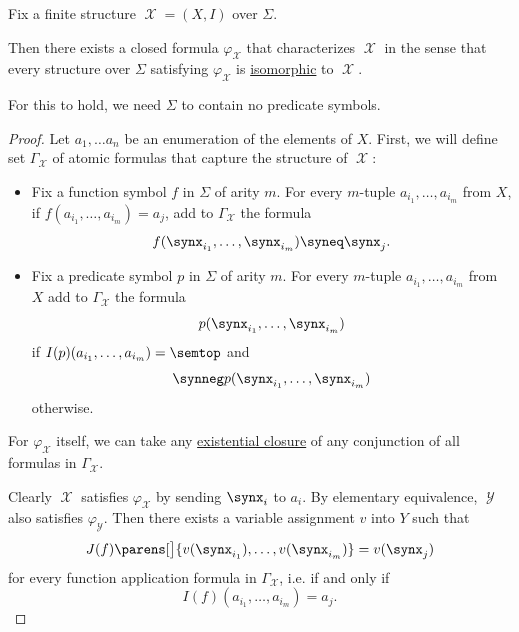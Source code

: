 \begin{lemma}\label{thm:fol_finite_structure_characterizing_formula}
  Fix a finite structure \( \mscrX = (X, I) \) over \( \Sigma \).

  Then there exists a closed formula \( \varphi_\mscrX \) that characterizes \( \mscrX \) in the sense that every structure over \( \Sigma \) satisfying \( \varphi_\mscrX \) is \hyperref[def:fol_isomorphism]{isomorphic} to \( \mscrX \).

  For this to hold, we need \( \Sigma \) to contain no predicate symbols.
\end{lemma}
\begin{proof}
  Let \( a_1, \ldots a_n \) be an enumeration of the elements of \( X \). First, we will define set \( \Gamma_\mscrX \) of atomic formulas that capture the structure of \( \mscrX \):
  \begin{itemize}
    \item Fix a function symbol \( f \) in \( \Sigma \) of arity \( m \). For every \( m \)-tuple \( a_{i_1}, \ldots, a_{i_m} \) from \( X \), if \( f(a_{i_1}, \ldots, a_{i_m}) = a_j \), add to \( \Gamma_\mscrX \) the formula
    \begin{equation*}
      f(\synx_{i_1}, \ldots, \synx_{i_m}) \syneq \synx_j.
    \end{equation*}

    \item Fix a predicate symbol \( p \) in \( \Sigma \) of arity \( m \). For every \( m \)-tuple \( a_{i_1}, \ldots, a_{i_m} \) from \( X \) add to \( \Gamma_\mscrX \) the formula
    \begin{equation*}
      p(\synx_{i_1}, \ldots, \synx_{i_m})
    \end{equation*}
    if \( I(p)(a_{i_1}, \ldots, a_{i_m}) = \semtop \) and
    \begin{equation*}
      \synneg p(\synx_{i_1}, \ldots, \synx_{i_m})
    \end{equation*}
    otherwise.
  \end{itemize}

  For \( \varphi_\mscrX \) itself, we can take any \hyperref[def:fol_quantifier_closure]{existential closure} of any conjunction of all formulas in \( \Gamma_\mscrX \).

  Clearly \( \mscrX \) satisfies \( \varphi_\mscrX \) by sending \( \synx_i \) to \( a_i \). By elementary equivalence, \( \mscrY \) also satisfies \( \varphi_\mscrY \). Then there exists a variable assignment \( v \) into \( Y \) such that
  \begin{equation*}
    J(f)\parens[\big]{ v(\synx_{i_1}), \ldots, v(\synx_{i_m}) } = v(\synx_j)
  \end{equation*}
  for every function application formula in \( \Gamma_\mscrX \), i.e. if and only if
  \begin{equation*}
    I(f)(a_{i_1}, \ldots, a_{i_m}) = a_j.
  \end{equation*}


\end{proof}
